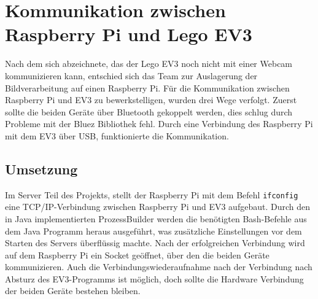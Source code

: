 \section{Kommunikation zwischen Raspberry Pi und Lego EV3}
Nach dem sich abzeichnete, das der Lego EV3 noch nicht mit einer Webcam kommunizieren kann, entschied sich das Team zur Auslagerung der Bildverarbeitung auf einen Raspberry Pi. Für die Kommunikation zwischen Raspberry Pi und EV3 zu bewerkstelligen, wurden drei Wege verfolgt. Zuerst sollte die beiden Geräte über Bluetooth gekoppelt werden, dies schlug durch Probleme mit der Bluez Bibliothek fehl. Durch eine Verbindung des Raspberry Pi mit dem EV3 über USB, funktionierte die Kommunikation.
\subsection{Umsetzung}
Im Server Teil des Projekts, stellt der Raspberry Pi mit dem Befehl \lstinline$ifconfig$ eine TCP/IP-Verbindung zwischen Raspberry Pi und EV3 aufgebaut. Durch den in Java implementierten ProzessBuilder werden die benötigten Bash-Befehle aus dem Java Programm heraus ausgeführt, was zusätzliche Einstellungen vor dem Starten des Servers überflüssig machte. Nach der erfolgreichen Verbindung wird auf dem Raspberry Pi ein Socket geöffnet, über den die beiden Geräte kommunizieren. Auch die Verbindungswiederaufnahme nach der Verbindung nach Absturz des EV3-Programms ist möglich, doch sollte die Hardware Verbindung der beiden Geräte bestehen bleiben.